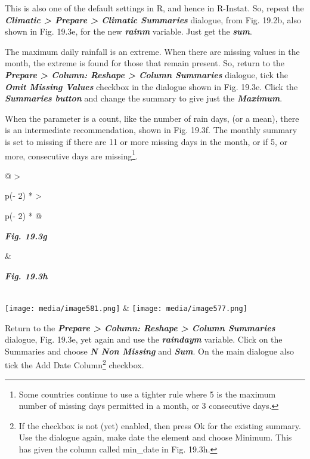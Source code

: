 \documentclass[
  letterpaper,
  DIV=11,
  numbers=noendperiod]{scrreprt}
\begin{document}
This is also one of the default settings in R, and hence in R-Instat.
So, repeat the \textbf{\emph{Climatic \textgreater{} Prepare
\textgreater{} Climatic Summaries}} dialogue, from Fig. 19.2b, also
shown in Fig. 19.3e, for the new \textbf{\emph{rainm}} variable. Just
get the \textbf{\emph{sum}}.

The maximum daily rainfall is an extreme. When there are missing values
in the month, the extreme is found for those that remain present. So,
return to the \textbf{\emph{Prepare \textgreater{} Column: Reshape
\textgreater{} Column Summaries}} dialogue, tick the \textbf{\emph{Omit
Missing Values}} checkbox in the dialogue shown in Fig. 19.3e. Click the
\textbf{\emph{Summaries button}} and change the summary to give just the
\textbf{\emph{Maximum}}.

When the parameter is a count, like the number of rain days, (or a
mean), there is an intermediate recommendation, shown in Fig. 19.3f. The
monthly summary is set to missing if there are 11 or more missing days
in the month, or if 5, or more, consecutive days are missing\footnote{Some
  countries continue to use a tighter rule where 5 is the maximum number
  of missing days permitted in a month, or 3 consecutive days.}.

\begin{longtable}[]{@{}
  >{\raggedright\arraybackslash}p{(\columnwidth - 2\tabcolsep) * }
  >{\raggedright\arraybackslash}p{(\columnwidth - 2\tabcolsep) * }@{}}
\toprule\noalign{}
\begin{minipage}[b]{\linewidth}\raggedright
\textbf{\emph{Fig. 19.3g}}
\end{minipage} & \begin{minipage}[b]{\linewidth}\raggedright
\textbf{\emph{Fig. 19.3h}}
\end{minipage} \\
\midrule\noalign{}
\endhead
\bottomrule\noalign{}
\endlastfoot
\texttt{[image: media/image581.png]} &
\texttt{[image: media/image577.png]} \\
\end{longtable}

Return to the \textbf{\emph{Prepare \textgreater{} Column: Reshape
\textgreater{} Column Summaries}} dialogue, Fig. 19.3e, yet again and
use the \textbf{\emph{raindaym}} variable. Click on the Summaries and
choose \textbf{\emph{N Non Missing}} and \textbf{\emph{Sum}}. On the
main dialogue also tick the Add Date Column\footnote{If the checkbox is
  not (yet) enabled, then press Ok for the existing summary. Use the
  dialogue again, make date the element and choose Minimum. This has
  given the column called min\_date in Fig. 19.3h.} checkbox.
\end{document}
